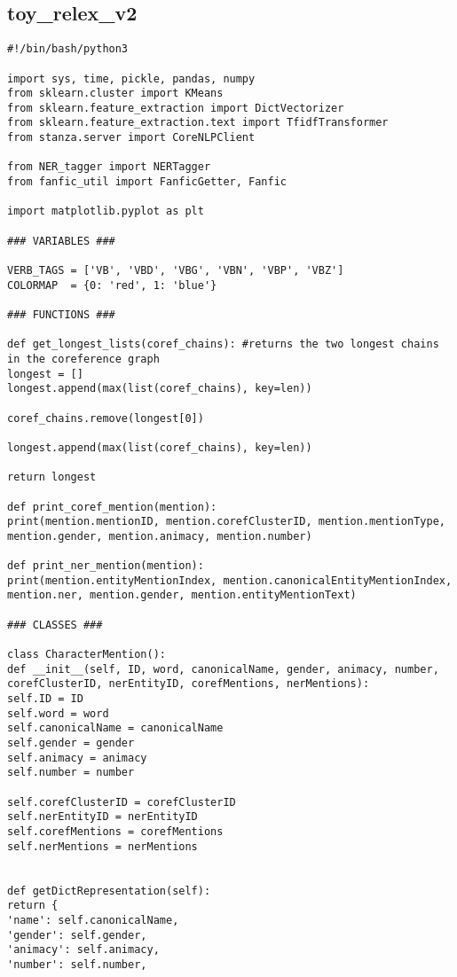 \documentclass{pre-tfg}
\begin{document}
\cleardoublepage
\subsection{toy\_relex\_v2}

\begin{lstlisting}[style=consola]
#!/bin/bash/python3

import sys, time, pickle, pandas, numpy
from sklearn.cluster import KMeans
from sklearn.feature_extraction import DictVectorizer
from sklearn.feature_extraction.text import TfidfTransformer
from stanza.server import CoreNLPClient

from NER_tagger import NERTagger
from fanfic_util import FanficGetter, Fanfic

import matplotlib.pyplot as plt

### VARIABLES ###

VERB_TAGS = ['VB', 'VBD', 'VBG', 'VBN', 'VBP', 'VBZ']
COLORMAP  = {0: 'red', 1: 'blue'}

### FUNCTIONS ###

def get_longest_lists(coref_chains): #returns the two longest chains in the coreference graph
longest = []
longest.append(max(list(coref_chains), key=len))

coref_chains.remove(longest[0])

longest.append(max(list(coref_chains), key=len))

return longest

def print_coref_mention(mention):
print(mention.mentionID, mention.corefClusterID, mention.mentionType, mention.gender, mention.animacy, mention.number)

def print_ner_mention(mention):	
print(mention.entityMentionIndex, mention.canonicalEntityMentionIndex, mention.ner, mention.gender, mention.entityMentionText)

### CLASSES ###

class CharacterMention():
def __init__(self, ID, word, canonicalName, gender, animacy, number, corefClusterID, nerEntityID, corefMentions, nerMentions):
self.ID = ID
self.word = word
self.canonicalName = canonicalName
self.gender = gender
self.animacy = animacy
self.number = number

self.corefClusterID = corefClusterID
self.nerEntityID = nerEntityID
self.corefMentions = corefMentions
self.nerMentions = nerMentions


def getDictRepresentation(self):
return {
'name': self.canonicalName,
'gender': self.gender,
'animacy': self.animacy,
'number': self.number,


\end{lstlisting}
\end{document}
